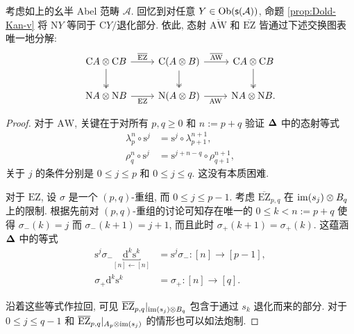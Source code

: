 \begin{lemma}\label{prop:EZ-aux}
	考虑如上的幺半 Abel 范畴 $\mathcal{A}$. 回忆到对任意 $Y \in \operatorname{Ob}(\mathsf{s}(\mathcal{A}))$, 命题 \ref{prop:Dold-Kan-v} 将 $\mathrm{N}Y$ 等同于 $\mathrm{C}Y / \text{退化部分}$. 依此, 态射 $\overline{\mathrm{AW}}$ 和 $\overline{\mathrm{EZ}}$ 皆通过下述交换图表唯一地分解:
	\[\begin{tikzcd}
		\mathrm{C}A \otimes \mathrm{C}B \arrow[r, "{\overline{\mathrm{EZ}}}"] \arrow[twoheadrightarrow, d] & \mathrm{C}(A \otimes B) \arrow[r, "{\overline{\mathrm{AW}}}"] \arrow[twoheadrightarrow, d] & \mathrm{C}A \otimes \mathrm{C}B \arrow[twoheadrightarrow, d] \\
		\mathrm{N}A \otimes \mathrm{N}B \arrow[r, "\mathrm{EZ}"'] & \mathrm{N}(A \otimes B) \arrow[r, "{\mathrm{AW}}"'] & \mathrm{N}A \otimes \mathrm{N}B .
	\end{tikzcd}\]
\end{lemma}
\begin{proof}
	对于 $\mathrm{AW}$, 关键在于对所有 $p, q \geq 0$ 和 $n := p + q$ 验证 $\bm\Delta$ 中的态射等式
	\begin{align*}
		\lambda^n_p \circ \mathrm{s}^j & = \mathrm{s}^j \circ \lambda^{n+1}_{p+1}, \\
		\rho^n_q \circ \mathrm{s}^j & = \mathrm{s}^{j+n-q} \circ \rho^{n+1}_{q+1},
	\end{align*}
	关于 $j$ 的条件分别是 $0 \leq j \leq p$ 和 $0 \leq j \leq q$. 这没有本质困难.

	对于 $\mathrm{EZ}$, 设 $\sigma$ 是一个 $(p, q)$-重组, 而 $0 \leq j \leq p-1$. 考虑 $\overline{\mathrm{EZ}}_{p, q}$ 在 $\operatorname{im}(s_j) \otimes B_q$ 上的限制. 根据先前对 $(p, q)$-重组的讨论可知存在唯一的 $0 \leq k < n := p+q$ 使得 $\sigma_-(k) = j$ 而 $\sigma_-(k+1) = j+1$, 而且此时 $\sigma_+(k+1) = \sigma_+(k)$. 这蕴涵 $\bm\Delta$ 中的等式
	\begin{align*}
		\mathrm{s}^j \sigma_- \underbracket{\mathrm{d}^k \mathrm{s}^k}_{[n] \leftarrow [n]} & = \mathrm{s}^j \sigma_- : [n] \to [p-1] , \\
		\sigma_+ \mathrm{d}^k \mathrm{s}^k & = \sigma_+ : [n] \to [q] .
	\end{align*}

	沿着这些等式作拉回, 可见 $\overline{\mathrm{EZ}}_{p, q}|_{\operatorname{im}(s_j) \otimes B_q}$ 包含于通过 $s_k$ 退化而来的部分. 对于 $0 \leq j \leq q-1$ 和 $\overline{\mathrm{EZ}}_{p, q}|_{A_p \otimes \operatorname{im}(s_j)}$ 的情形也可以如法炮制.
\end{proof}

